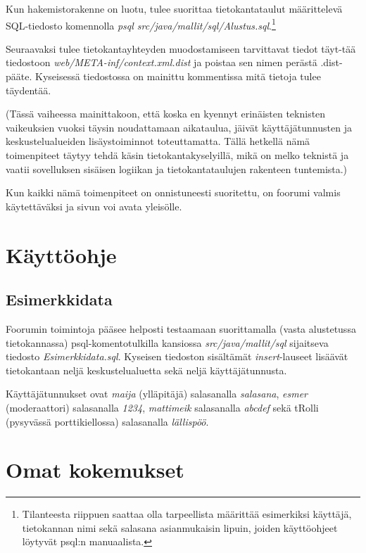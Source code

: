 \documentclass[11pt]{article}
\begin{document}
		Kun hakemistorakenne on luotu, tulee suorittaa tietokantataulut määrittelevä SQL-tiedosto komennolla
		\emph{psql src/java/mallit/sql/Alustus.sql}.\footnote{Tilanteesta riippuen saattaa olla
		tarpeellista määrittää esimerkiksi käyttäjä, tietokannan nimi sekä salasana asianmukaisin lipuin,
		joiden käyttöohjeet löytyvät psql:n manuaalista.}
		
		Seuraavaksi tulee tietokantayhteyden muodostamiseen tarvittavat tiedot täyt-tää tiedostoon
		\emph{web/META-inf/context.xml.dist} ja poistaa sen nimen perästä .dist-pääte. Kyseisessä tiedostossa
		on mainittu kommentissa mitä tietoja tulee täydentää. 
		
		(Tässä vaiheessa mainittakoon, että koska en kyennyt erinäisten teknisten vaikeuksien vuoksi täysin
		noudattamaan aikataulua, jäivät käyttäjätunnusten ja keskustelualueiden lisäystoiminnot toteuttamatta.
		Tällä hetkellä nämä toimenpiteet täytyy tehdä käsin tietokantakyselyillä, mikä on melko teknistä ja 
		vaatii sovelluksen sisäisen logiikan ja tietokantataulujen rakenteen tuntemista.)
		
		Kun kaikki nämä toimenpiteet on onnistuneesti suoritettu, on foorumi valmis käytettäväksi ja sivun
		voi avata yleisölle.
		
\newpage
\thispagestyle{plain}
	\section{Käyttöohje}
		\subsection{Esimerkkidata} Foorumin toimintoja pääsee helposti testaamaan suorittamalla (vasta
		alustetussa tietokannassa) psql-komentotulkilla kansiossa \emph{src/java/mallit/sql} sijaitseva
		tiedosto \emph{Esimerkkidata.sql}. Kyseisen tiedoston sisältämät \emph{insert}-lauseet lisäävät
		tietokantaan neljä keskustelualuetta sekä neljä käyttäjätunnusta.
		
		Käyttäjätunnukset ovat \emph{maija} (ylläpitäjä) salasanalla \emph{salasana}, \emph{esmer}
		(moderaattori) salasanalla \emph{1234}, \emph{mattimeik} salasanalla \emph{abcdef} sekä tRolli
		(pysyvässä porttikiellossa) salasanalla \emph{lällispöö}.
		
		
\newpage
\thispagestyle{plain}
	\section{Omat kokemukset}
	

	
\end{document}
